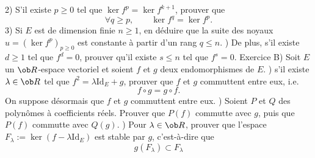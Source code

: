 2) S'il existe $p\ge0$ tel que $\ker f^p=\ker f^{k+1}$, prouver que 
$$
\forall q\ge p, \qquad \ker f^q=\ker f^p. 
$$
3) Si $E$ est de dimension finie $n\ge1$, en d\'eduire que la suite des noyaux $u=(\ker f^p)_{p\ge0}$ est constante \`a partir d'un rang $q\le n$. 
\bigskip{}) De plus, s'il existe $d\ge1$ tel que $f^d=0$, prouver qu'il existe $s\le n$ 
tel que $f^s=0$. 
\bigskip\bigskip
\noindent
{\twelvebf Exercice B)} Soit $E$ un $\ob R$-espace vectoriel et soient $f$ et $g$ deux endomorphismes de $E$. \medskip
{}) s'il existe $\lambda\in\ob R$ tel que 
$f^2=\lambda\mbox{Id}_E+g$, prouver que $f$ et $g$ commuttent entre eux, i.e. 
$$
f\circ g=g\circ f. 
$$
On suppose d\'esormais que $f$ et $g$ commuttent entre eux. \medskip\noindent
{}) Soient $P$ et $Q$ des polyn\^omes \`a coefficients r\'eels. Prouver que $P(f)$ commutte avec $g$, puis que $P(f)$ commutte avec $Q(g)$. 
\bigskip
{}) Pour $\lambda\in\ob R$, prouver que l'espace $F_\lambda:=\ker(f-\lambda\mbox{Id}_E)$ est stable par $g$, c'est-\`a-dire que 
$$
g(F_\lambda)\subset F_\lambda
$$




\bye



